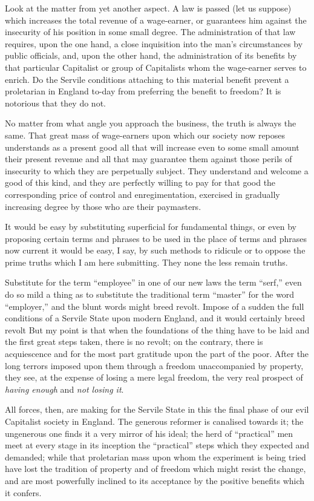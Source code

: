 \documentclass{book}
\begin{document}
Look at the matter from yet another aspect. A law is passed (let us suppose) which increases the total revenue of a wage-earner, or guarantees him against the insecurity of his position in some small degree. The administration of that law requires, upon the one hand, a close inquisition into the man’s circumstances by public officials, and, upon the other hand, the administration of its benefits by that particular Capitalist or group of Capitalists whom the wage-earner serves to enrich. Do the Servile conditions attaching to this material benefit prevent a proletarian in England to-day from preferring the benefit to freedom? It is notorious that they do not.

No matter from what angle you approach the business, the truth is always the same. That great mass of wage-earners upon which our society now reposes understands as a present good all that will increase even to some small amount their present revenue and all that may guarantee them against those perils of insecurity to which they are perpetually subject. They understand and welcome a good of this kind, and they are perfectly willing to pay for that good the corresponding price of control and enregimentation, exercised in gradually increasing degree by those who are their paymasters.

It would be easy by substituting superficial for fundamental things, or even by proposing certain terms and phrases to be used in the place of terms and phrases now current it would be easy, I say, by such methods to ridicule or to oppose the prime truths which I am here submitting. They none the less remain truths.

Substitute for the term “employee” in one of our new laws the term “serf,” even do so mild a thing as to substitute the traditional term “master” for the word “employer,” and the blunt words might breed revolt. Impose of a sudden the full conditions of a Servile State upon modern England, and it would certainly breed revolt But my point is that when the foundations of the thing have to be laid and the first great steps taken, there is no revolt; on the contrary, there is acquiescence and for the most part gratitude upon the part of the poor. After the long terrors imposed upon them through a freedom unaccompanied by property, they see, at the expense of losing a mere legal freedom, the very real prospect of \emph{having enough} and \emph{not losing it}.

All forces, then, are making for the Servile State in this the final phase of our evil Capitalist society in England. The generous reformer is canalised towards it; the ungenerous one finds it a very mirror of his ideal; the herd of “practical” men meet at every stage in its inception the “practical” steps which they expected and demanded; while that proletarian mass upon whom the experiment is being tried have lost the tradition of property and of freedom which might resist the change, and are most powerfully inclined to its acceptance by the positive benefits which it confers.
\end{document}
